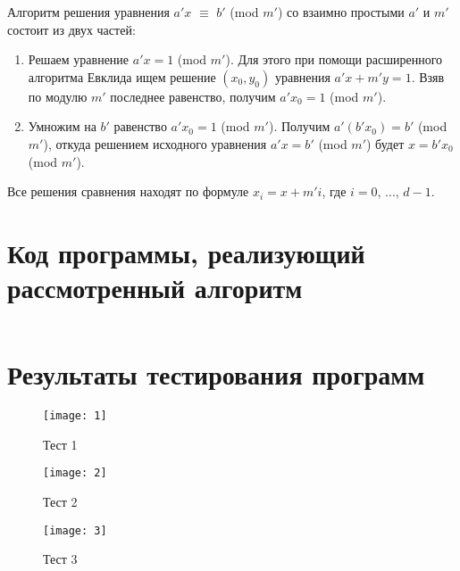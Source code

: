 \documentclass[spec, och, labwork]{shiza}
\begin{document}
Алгоритм решения уравнения $a'x$ $\equiv$ $b'$ (mod $m'$) со взаимно
простыми $a'$ и $m'$ состоит из двух частей:

\begin{enumerate}
    \item Решаем уравнение $a'x = 1$ (mod $m'$). Для этого при помощи
    расширенного алгоритма Евклида ищем решение $(x_0, y_0)$ уравнения
    $a'x + m'y = 1$. Взяв по модулю $m'$ последнее равенство, получим 
    $a'x_0 = 1$ (mod $m'$).
    \item Умножим на $b'$ равенство $a'x_0 = 1$ (mod $m'$). Получим 
    $a'(b'x_0) = b'$ (mod $m'$), откуда решением исходного уравнения 
    $a'x = b'$ (mod $m'$) будет $x = b'x_0$ (mod $m'$).
\end{enumerate}

Все решения сравнения находят по формуле $x_i = x + m'i$, где $i = 0$, ..., 
$d - 1$.

\section{Код программы, реализующий рассмотренный алгоритм}

    \inputminted[fontsize=\small]{scala}{../code/task1.scala}
    
\section{Результаты тестирования программ}

        \begin{figure}[H]
            \centering      %
            \texttt{[image: 1]}
            \caption{Тест 1}
            \label{fig:image1}
        \end{figure}
        
        \begin{figure}[H]
            \centering      %
            \texttt{[image: 2]}
            \caption{Тест 2}
            \label{fig:image1}
        \end{figure}

        \begin{figure}[H]
            \centering      %
            \texttt{[image: 3]}
            \caption{Тест 3}
            \label{fig:image1}
        \end{figure}
\end{document}
